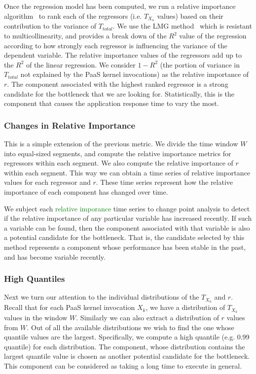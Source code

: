 Once the regression model has been computed, we run a relative importance algorithm~\cite{JSSv017i01} to rank each of the
regressors (i.e. $T_{X_n}$ values) based on their contribution to the variance of $T_{total}$. 
We use the LMG method~\cite{lmg80} which is resistant to multicollinearity, and provides a break down of the $R^2$ value of
the regression according to how strongly each regressor is influencing the variance of the dependent variable.
The relative importance values of the regressors add up to the $R^2$ of the linear regression. We consider
$1 - R^2$ (the portion of variance in $T_{total}$ not explained by the PaaS kernel invocations) as the relative importance of $r$. 
The component associated with the highest ranked regressor is a strong candidate
for the bottleneck that we are looking for. Statistically, this is the component that causes the application
response time to vary the most.

\subsubsection{Changes in Relative Importance}
This is a simple extension of the previous metric. We divide the time window $W$ into equal-sized segments,
and compute the relative importance metrics for regressors within each segment. We also compute the
relative importance of $r$ within each segment. This way we can
obtain a time series of relative importance values for each regressor and $r$. These time series
represent how the relative importance of each component has changed over time.

We subject each \textcolor{green}{relative imporance} time series to change point analysis to detect if the relative importance of any particular
variable has increased recently. If such a variable can be found, then the component
associated with that variable is also a potential candidate for the bottleneck. 
That is, the candidate selected by this method represents
a component whose performance has been stable in the past, and has become variable recently. 

\subsubsection{High Quantiles}
\label{sec:highquantile}
Next we turn our attention to the individual distributions of the $T_{X_n}$ and $r$. 
Recall that for each PaaS kernel invocation
$X_k$, we have a distribution of $T_{X_k}$ values in the window $W$. Similarly we
can also extract a distribution of $r$ values from $W$. Out of all the available distributions
we wish to find the one whose quantile values are the largest.
Specifically, we compute a high
quantile (e.g. 0.99 quantile) for each distribution. The component, whose distribution 
contains the largest quantile value
is chosen as another potential candidate for the bottleneck. This component can be considered
as taking a long time to execute in general.

